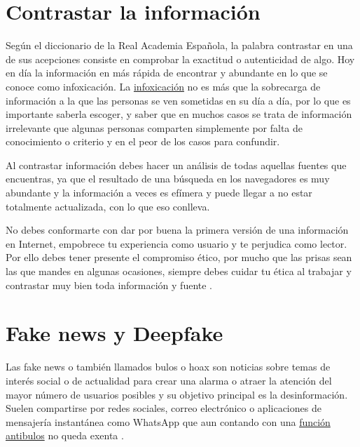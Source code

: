 \documentclass[
  a4paper,
  openany]{book}
\begin{document}
\hypertarget{contrastar-la-informaciuxf3n}{%
\section{Contrastar la información}\label{contrastar-la-informaciuxf3n}}

Según el diccionario de la Real Academia Española, la palabra contrastar en una de sus acepciones consiste en comprobar la exactitud o autenticidad de algo. Hoy en día la información en más rápida de encontrar y abundante en lo que se conoce como infoxicación. La \href{https://es.godaddy.com/blog/infoxicacion-causas-consecuencias/}{infoxicación} no es más que la sobrecarga de información a la que las personas se ven sometidas en su día a día, por lo que es importante saberla escoger, y saber que en muchos casos se trata de información irrelevante que algunas personas comparten simplemente por falta de conocimiento o criterio y en el peor de los casos para confundir.

Al contrastar información debes hacer un análisis de todas aquellas fuentes que encuentras, ya que el resultado de una búsqueda en los navegadores es muy abundante y la información a veces es efímera y puede llegar a no estar totalmente actualizada, con lo que eso conlleva.

No debes conformarte con dar por buena la primera versión de una información en Internet, empobrece tu experiencia como usuario y te perjudica como lector. Por ello debes tener presente el compromiso ético, por mucho que las prisas sean las que mandes en algunas ocasiones, siempre debes cuidar tu ética al trabajar y contrastar muy bien toda información y fuente \citep{contrastar-informacion}.

\hypertarget{fake-news-y-deepfake}{%
\section{Fake news y Deepfake}\label{fake-news-y-deepfake}}

Las fake news o también llamados bulos o hoax son noticias sobre temas de interés social o de actualidad para crear una alarma o atraer la atención del mayor número de usuarios posibles y su objetivo principal es la desinformación. Suelen compartirse por redes sociales, correo electrónico o aplicaciones de mensajería instantánea como WhatsApp que aun contando con una \href{https://www.osi.es/es/actualidad/blog/2020/04/27/whatsapp-y-su-funcion-antibulos-descubrela}{función antibulos} no queda exenta \citep{OSI-bulos-buenas-practicas}.
\end{document}
